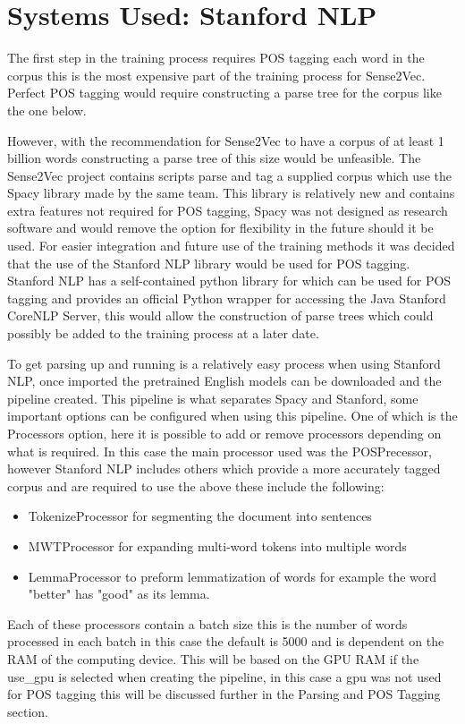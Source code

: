\section{Systems Used: Stanford NLP}
The first step in the training process requires POS tagging each word in the corpus this is the most expensive part of the training process for Sense2Vec. Perfect POS tagging would require constructing a parse tree for the corpus like the one below.

However, with the recommendation for Sense2Vec to have a corpus of at least 1 billion words constructing a parse tree of this size would be unfeasible. The Sense2Vec project contains scripts parse and tag a supplied corpus which use the Spacy library made by the same team. This library is relatively new and contains extra features not required for POS tagging, Spacy was not designed as research software and would remove the option for flexibility in the future should it be used. For easier integration and future use of the training methods it was decided that the use of the Stanford NLP library would be used for POS tagging. Stanford NLP has a self-contained python library for which can be used for POS tagging and provides an official Python wrapper for accessing the Java Stanford CoreNLP Server, this would allow the construction of parse trees which could possibly be added to the training process at a later date.

To get parsing up and running is a relatively easy process when using Stanford NLP, once imported the pretrained English models can be downloaded and the pipeline created. This pipeline is what separates Spacy and Stanford, some important options can be configured when using this pipeline. One of which is the Processors option, here it is possible to add or remove processors depending on what is required. In this case the main processor used was the POSPrecessor, however Stanford NLP includes others which provide a more accurately tagged corpus and are required to use the above these include the following:

\begin{itemize}
  \item TokenizeProcessor for segmenting the document into sentences
  \item MWTProcessor for expanding multi-word tokens into multiple words
  \item LemmaProcessor to preform lemmatization of words for example the word "better" has "good" as its lemma.
\end{itemize}
Each of these processors contain a batch size this is the number of words processed in each batch in this case the default is 5000 and is dependent on the RAM of the computing device. This will be based on the GPU RAM if the use\_gpu is selected when creating the pipeline, in this case a gpu was not used for POS tagging this will be discussed further in the Parsing and POS Tagging section.

